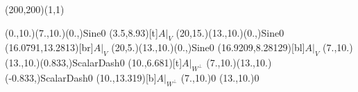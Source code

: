 \unitlength=1bp%

\begin{feynartspicture}(200,200)(1,1)

\FADiagram{}
\FAProp(0.,10.)(7.,10.)(0.,){Sine}{0}
\FALabel(3.5,8.93)[t]{$A|_V$}
\FAProp(20,15.)(13.,10.)(0.,){Sine}{0}
\FALabel(16.0791,13.2813)[br]{$A|_V$}
\FAProp(20,5.)(13.,10.)(0.,){Sine}{0}
\FALabel(16.9209,8.28129)[bl]{$A|_V$}
\FAProp(7.,10.)(13.,10.)(0.833,){ScalarDash}{0}
\FALabel(10.,6.681)[t]{$A|_{W^\perp}$}
\FAProp(7.,10.)(13.,10.)(-0.833,){ScalarDash}{0}
\FALabel(10.,13.319)[b]{$A|_{W^\perp}$}
\FAVert(7.,10.){0}
\FAVert(13.,10.){0}
\end{feynartspicture}


